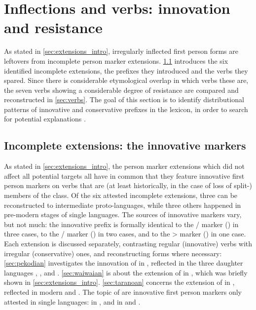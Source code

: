 \section{Inflections and verbs: innovation and resistance}
\label{sec:data}
As stated in \cref{sec:extensions_intro}, irregularly inflected first person forms are leftovers from incomplete person marker extensions.
\cref{sec:extensions} introduces the six identified incomplete extensions, the prefixes they introduced and the verbs they spared.
Since there is considerable etymological overlap in which verbs these are, the seven verbs showing a considerable degree of resistance are compared and reconstructed in \cref{sec:verbs}.
The goal of this section is to identify distributional patterns of innovative and conservative prefixes in the  lexicon, in order to search for potential explanations .

\subsection{Incomplete extensions: the innovative \texorpdfstring{}{Sa} markers}
\label{sec:extensions}
As stated in \cref{sec:extensions_intro}, the person marker extensions which did not affect all potential targets all have in common that they feature innovative first person markers on verbs that are (at least historically, in the case of loss of split-) members of the  class.
Of the six attested incomplete extensions, three can be reconstructed to intermediate proto-languages, while three others happened in pre-modern stages of single languages.
The sources of innovative markers vary, but not much: the innovative  prefix is formally identical to the / marker (\PC {}) in three cases, to the / marker (\PC {}) in two cases, and to the > marker (\PC {}) in one case.
Each extension is discussed separately, contrasting regular (innovative) verbs with irregular (conservative) ones, and reconstructing forms where necessary:
\cref{sec:pekodian} investigates the innovation of  in \PPek, reflected in the three daughter languages \arara, \ikpeng, and \bakairi.
\cref{sec:waiwaian} is about the extension of  in \PWai, which was briefly shown in \cref{sec:extensions_intro}.
\cref{sec:taranoan} concerns the extension of  in \PTir, reflected in modern \trio and \akuriyo.
The topic of  are innovative first person markers only attested in single languages:
 in \akuriyo, and  in \carijo and \yukpa.
 
